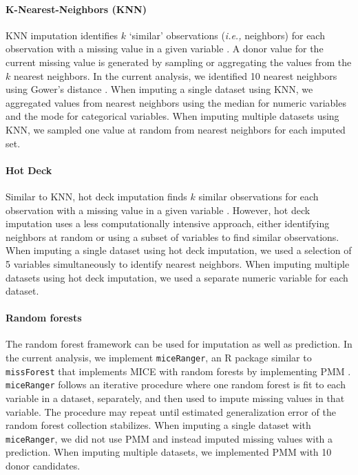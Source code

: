 \documentclass{article}
\begin{document}
\paragraph{K-Nearest-Neighbors (KNN)}

KNN imputation identifies \(k\) `similar' observations
(\textit{i.e., }neighbors) for each observation with a missing value in
a given variable \cite{chen2000nearest}. A donor value for the current
missing value is generated by sampling or aggregating the values from
the \(k\) nearest neighbors. In the current analysis, we identified 10
nearest neighbors using Gower's distance \cite{gower}. When imputing a
single dataset using KNN, we aggregated values from nearest neighbors
using the median for numeric variables and the mode for categorical
variables. When imputing multiple datasets using KNN, we sampled one
value at random from nearest neighbors for each imputed set.

\paragraph{Hot Deck}

Similar to KNN, hot deck imputation finds \(k\) similar observations for
each observation with a missing value in a given variable
\cite{andridge2010hotdeck}. However, hot deck imputation uses a less
computationally intensive approach, either identifying neighbors at
random or using a subset of variables to find similar observations. When
imputing a single dataset using hot deck imputation, we used a selection
of 5 variables simultaneously to identify nearest neighbors. When
imputing multiple datasets using hot deck imputation, we used a separate
numeric variable for each dataset.

\paragraph{Random forests}

The random forest framework can be used for imputation as well as
prediction. In the current analysis, we implement \texttt{miceRanger},
an R package similar to \texttt{missForest} that implements MICE with
random forests by implementing PMM \cite{missForest}.
\texttt{miceRanger} follows an iterative procedure where one random
forest is fit to each variable in a dataset, separately, and then used
to impute missing values in that variable. The procedure may repeat
until estimated generalization error of the random forest collection
stabilizes. When imputing a single dataset with \texttt{miceRanger}, we
did not use PMM and instead imputed missing values with a prediction.
When imputing multiple datasets, we implemented PMM with 10 donor
candidates.
\end{document}
